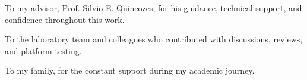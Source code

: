 \begin{agradecimentos}

To my advisor, Prof. Silvio E. Quincozes, for his guidance, technical support, and confidence throughout this work.

To the laboratory team and colleagues who contributed with discussions, reviews, and platform testing.

To my family, for the constant support during my academic journey.

\end{agradecimentos}

